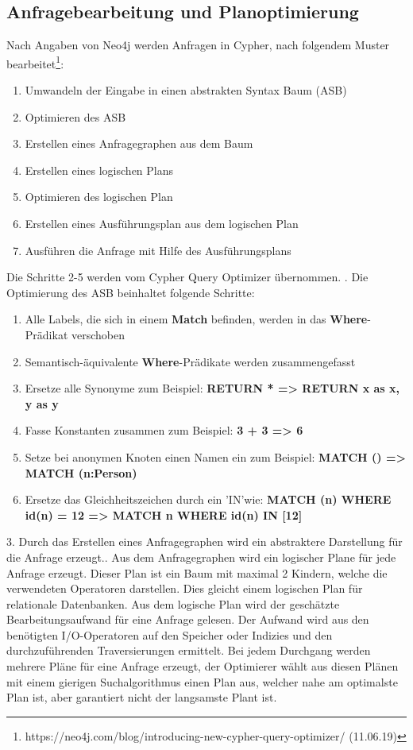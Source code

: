 \subsection{Anfragebearbeitung und Planoptimierung}
Nach Angaben von Neo4j werden Anfragen in Cypher, nach folgendem Muster bearbeitet\footnote{https://neo4j.com/blog/introducing-new-cypher-query-optimizer/  (11.06.19)}:
\begin{enumerate}
	\item Umwandeln der Eingabe in einen abstrakten Syntax Baum (ASB)
	\item Optimieren des ASB
	\item Erstellen eines Anfragegraphen aus dem Baum
	\item Erstellen eines logischen Plans
	\item Optimieren des logischen Plan 
	\item Erstellen eines Ausführungsplan aus dem logischen Plan
	\item Ausführen die Anfrage mit Hilfe des Ausführungsplans  
\end{enumerate}
Die Schritte 2-5 werden vom Cypher Query Optimizer übernommen. \newline
{}. Die Optimierung des ASB beinhaltet folgende Schritte: 
\begin{enumerate}[label=(\roman*)]
	\item Alle Labels, die sich in einem \textbf{Match} befinden, werden in das \textbf{Where}-Prädikat verschoben
	\item  Semantisch-äquivalente \textbf{Where}-Prädikate werden zusammengefasst
	\item Ersetze alle Synonyme zum Beispiel: \textbf{RETURN * => RETURN x as x, y as y}
	\item Fasse Konstanten zusammen zum Beispiel: \textbf{3 + 3 => 6}
	\item Setze bei anonymen Knoten einen Namen ein zum Beispiel: \textbf{ MATCH () => MATCH (n:Person)}
	\item Ersetze das Gleichheitszeichen durch ein 'IN'wie: \textbf{MATCH (n) WHERE id(n) = 12 => MATCH n WHERE id(n) IN [12]}
\end{enumerate}
3. Durch das Erstellen eines Anfragegraphen wird ein abstraktere Darstellung für die Anfrage erzeugt.\newline {}. Aus dem Anfragegraphen wird ein logischer Plane für jede Anfrage erzeugt. Dieser Plan ist ein Baum mit maximal 2 Kindern, welche die verwendeten Operatoren darstellen. Dies gleicht einem logischen Plan für relationale Datenbanken. Aus dem logische Plan wird der geschätzte Bearbeitungsaufwand für eine Anfrage gelesen. Der Aufwand wird aus den benötigten I/O-Operatoren auf den Speicher oder Indizies und den durchzuführenden Traversierungen ermittelt. Bei jedem Durchgang werden mehrere Pläne für eine Anfrage erzeugt, der Optimierer wählt aus diesen Plänen mit einem gierigen Suchalgorithmus einen Plan aus, welcher nahe am optimalste Plan ist, aber garantiert nicht der langsamste Plant ist. \newline \newline
